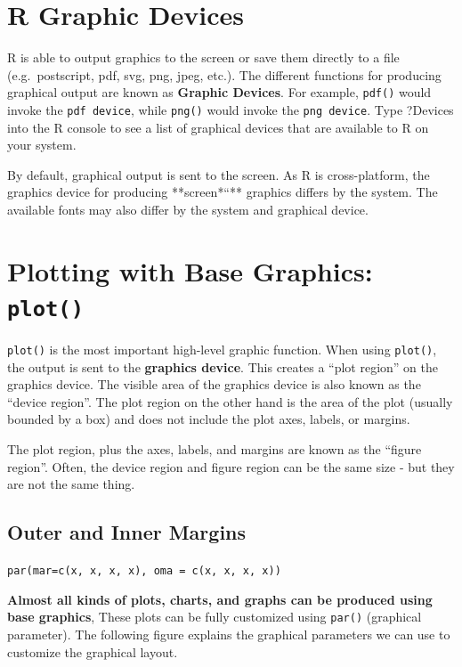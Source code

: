 \documentclass[
]{book}
\begin{document}
\hypertarget{r-graphic-devices}{%
\section{R Graphic Devices}\label{r-graphic-devices}}

R is able to output graphics to the screen or save them directly to a file (e.g.~postscript, pdf, svg, png, jpeg, etc.). The different functions for producing graphical output are known as \textbf{Graphic Devices}. For example, \texttt{pdf()} would invoke the \texttt{pdf\ device}, while \texttt{png()} would invoke the \texttt{png\ device}. Type ?Devices into the R console to see a list of graphical devices that are available to R on your system.

By default, graphical output is sent to the screen. As R is cross-platform, the graphics device for producing **screen*``** graphics differs by the system. The available fonts may also differ by the system and graphical device.

\hypertarget{plotting-with-base-graphics-plot}{%
\section{\texorpdfstring{Plotting with Base Graphics: \texttt{plot()}}{Plotting with Base Graphics: plot()}}\label{plotting-with-base-graphics-plot}}

\texttt{plot()} is the most important high-level graphic function. When using \texttt{plot()}, the output is sent to the \textbf{graphics device}. This creates a ``plot region'' on the graphics device. The visible area of the graphics device is also known as the ``device region''. The plot region on the other hand is the area of the plot (usually bounded by a box) and does not include the plot axes, labels, or margins.

The plot region, plus the axes, labels, and margins are known as the ``figure region''. Often, the device region and figure region can be the same size - but they are not the same thing.

\hypertarget{outer-and-inner-margins}{%
\subsection{Outer and Inner Margins}\label{outer-and-inner-margins}}

\texttt{par(mar=c(x,\ x,\ x,\ x),\ oma\ =\ c(x,\ x,\ x,\ x))}

\textbf{\color{red}Almost all kinds of plots, charts, and graphs can be produced using base graphics}, These plots can be fully customized using \texttt{par()} (graphical parameter). The following figure explains the graphical parameters we can use to customize the graphical layout.
\end{document}
